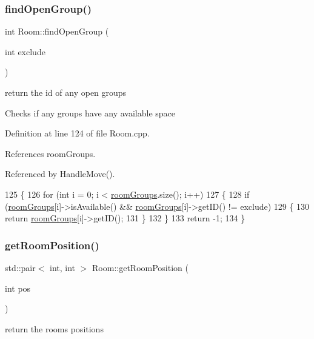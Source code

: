 \subsubsection{\texorpdfstring{find\+Open\+Group()}{findOpenGroup()}}
{\footnotesize\ttfamily int Room\+::find\+Open\+Group (\begin{DoxyParamCaption}\item[{int}]{exclude }\end{DoxyParamCaption})}



return the id of any open groups 

Checks if any groups have any available space 

Definition at line 124 of file Room.\+cpp.



References room\+Groups.



Referenced by Handle\+Move().


\begin{DoxyCode}
125 \{
126     \textcolor{keywordflow}{for} (\textcolor{keywordtype}{int} i = 0; i < \hyperlink{class_room_a2d63fa17f30d50dd5267f04170a662b0}{roomGroups}.size(); i++)
127     \{
128         \textcolor{keywordflow}{if} (\hyperlink{class_room_a2d63fa17f30d50dd5267f04170a662b0}{roomGroups}[i]->isAvailable() && \hyperlink{class_room_a2d63fa17f30d50dd5267f04170a662b0}{roomGroups}[i]->getID() != exclude)
129         \{
130             \textcolor{keywordflow}{return} \hyperlink{class_room_a2d63fa17f30d50dd5267f04170a662b0}{roomGroups}[i]->getID();
131         \}
132     \}
133     \textcolor{keywordflow}{return} -1;
134 \}
\end{DoxyCode}
\mbox{\label{class_room_ac57c28e2c1048649e816f731f63f9daf}} 
\subsubsection{\texorpdfstring{get\+Room\+Position()}{getRoomPosition()}}
{\footnotesize\ttfamily std\+::pair$<$ int, int $>$ Room\+::get\+Room\+Position (\begin{DoxyParamCaption}\item[{int}]{pos }\end{DoxyParamCaption})}



return the rooms positions 

